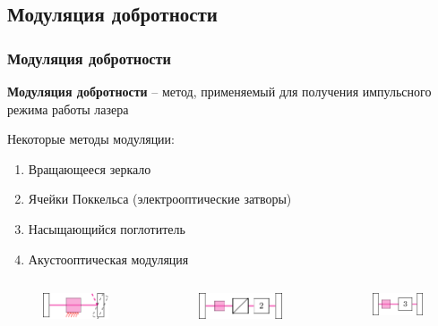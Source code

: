 \documentclass[10pt,pdf,hyperref={unicode}, dvipsnames]{beamer}
\newcommand\frametitless[1]{\subsection{#1}\frametitle{#1}}
\begin{document}
\begin{frame}[t]
	\frametitless{Модуляция добротности}
	\textbf{Модуляция добротности} -- метод, применяемый для получения импульсного режима работы лазера

	\vspace{1em}
	Некоторые методы модуляции:

	\begin{enumerate}
		\item Вращающееся зеркало
		\item Ячейки Поккельса (электрооптические затворы)
		\item Насыщающийся поглотитель
		\item Акустооптическая модуляция

	\end{enumerate}
	\begin{columns}
		\begin{column}{0.3\textwidth}
			\begin{figure}[h]
				\centering
				\includegraphics[]{images/rot_flip}
			\end{figure}	
		\end{column}
		\begin{column}{0.3\textwidth}
			\begin{figure}[h]
				\centering
				\includegraphics[]{images/pockels_cell}
			\end{figure}	
		\end{column}
		\begin{column}{0.3\textwidth}
			\begin{figure}[h]
				\centering
				\includegraphics[]{images/pogl}
			\end{figure}	
		\end{column}		
	\end{columns}


\end{frame}
\end{document}
